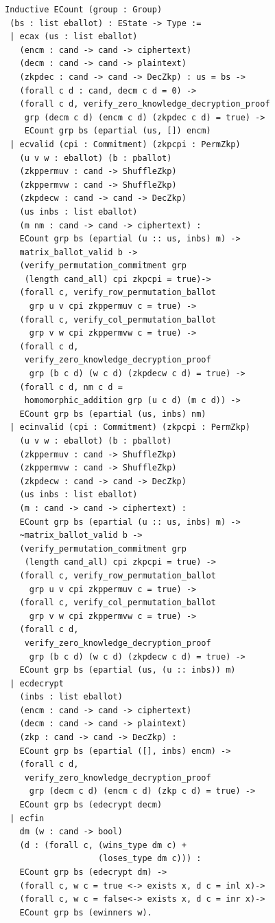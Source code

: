 \documentclass{llncs}
\begin{document}
\begin{verbatim}
Inductive ECount (group : Group) 
 (bs : list eballot) : EState -> Type :=
 | ecax (us : list eballot) 
   (encm : cand -> cand -> ciphertext)
   (decm : cand -> cand -> plaintext) 
   (zkpdec : cand -> cand -> DecZkp) : us = bs -> 
   (forall c d : cand, decm c d = 0) -> 
   (forall c d, verify_zero_knowledge_decryption_proof 
    grp (decm c d) (encm c d) (zkpdec c d) = true) -> 
    ECount grp bs (epartial (us, []) encm)
 | ecvalid (cpi : Commitment) (zkpcpi : PermZkp)
   (u v w : eballot) (b : pballot)
   (zkppermuv : cand -> ShuffleZkp)
   (zkppermvw : cand -> ShuffleZkp) 
   (zkpdecw : cand -> cand -> DecZkp)
   (us inbs : list eballot)
   (m nm : cand -> cand -> ciphertext) :
   ECount grp bs (epartial (u :: us, inbs) m) ->
   matrix_ballot_valid b ->
   (verify_permutation_commitment grp 
    (length cand_all) cpi zkpcpi = true)->
   (forall c, verify_row_permutation_ballot
     grp u v cpi zkppermuv c = true) ->
   (forall c, verify_col_permutation_ballot
     grp v w cpi zkppermvw c = true) ->
   (forall c d, 
    verify_zero_knowledge_decryption_proof 
     grp (b c d) (w c d) (zkpdecw c d) = true) ->
   (forall c d, nm c d = 
    homomorphic_addition grp (u c d) (m c d)) -> 
   ECount grp bs (epartial (us, inbs) nm)
 | ecinvalid (cpi : Commitment) (zkpcpi : PermZkp)
   (u v w : eballot) (b : pballot) 
   (zkppermuv : cand -> ShuffleZkp)
   (zkppermvw : cand -> ShuffleZkp) 
   (zkpdecw : cand -> cand -> DecZkp)
   (us inbs : list eballot)
   (m : cand -> cand -> ciphertext) :
   ECount grp bs (epartial (u :: us, inbs) m) ->
   ~matrix_ballot_valid b ->
   (verify_permutation_commitment grp 
    (length cand_all) cpi zkpcpi = true) ->
   (forall c, verify_row_permutation_ballot
     grp u v cpi zkppermuv c = true) ->
   (forall c, verify_col_permutation_ballot
     grp v w cpi zkppermvw c = true) ->
   (forall c d, 
    verify_zero_knowledge_decryption_proof 
     grp (b c d) (w c d) (zkpdecw c d) = true) ->
   ECount grp bs (epartial (us, (u :: inbs)) m)
 | ecdecrypt 
   (inbs : list eballot) 
   (encm : cand -> cand -> ciphertext)
   (decm : cand -> cand -> plaintext)
   (zkp : cand -> cand -> DecZkp) :
   ECount grp bs (epartial ([], inbs) encm) ->
   (forall c d, 
    verify_zero_knowledge_decryption_proof
     grp (decm c d) (encm c d) (zkp c d) = true) ->
   ECount grp bs (edecrypt decm)
 | ecfin 
   dm (w : cand -> bool) 
   (d : (forall c, (wins_type dm c) + 
                   (loses_type dm c))) :
   ECount grp bs (edecrypt dm) ->
   (forall c, w c = true <-> exists x, d c = inl x)->
   (forall c, w c = false<-> exists x, d c = inr x)->
   ECount grp bs (ewinners w).
\end{verbatim}	
\end{document}
